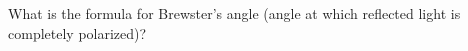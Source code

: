 

\vspace*{\fill}
\centering

What is the formula for Brewster's angle (angle at which reflected light is completely polarized)?

\centering
\vspace*{\fill}

